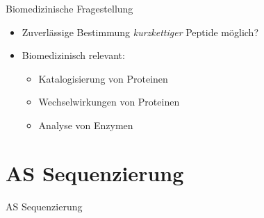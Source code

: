 \documentclass{beamer}
\begin{document}
\begin{frame}{Biomedizinische Fragestellung}
{\begin{minipage}[c]{0.775\textwidth}
        \begin{itemize}
        \item<1-> Zuverlässige Bestimmung \emph{kurzkettiger} Peptide möglich?
        \item<2-> Biomedizinisch relevant:
        \begin{itemize}
         \item<3-> Katalogisierung von Proteinen
         \item<4-> Wechselwirkungen von Proteinen
         \item<5-> Analyse von Enzymen
        \end{itemize}
        \end{itemize}
        \end{minipage}
        }
        \end{frame}



    \section{AS Sequenzierung}
    \begin{frame}{AS Sequenzierung}
    \end{frame}
\end{document}
